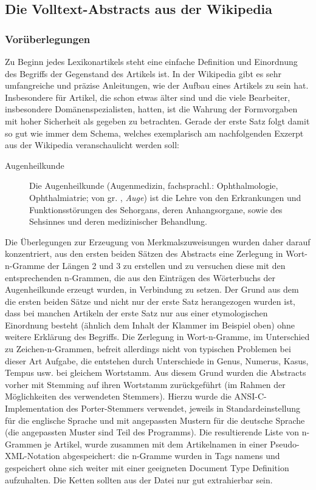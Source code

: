 \documentclass[pagesize,DIV=calc,12pt,draft]{scrreprt}
\begin{document}
\subsection{Die Volltext-Abstracts aus der Wikipedia}

\subsubsection{Vorüberlegungen}

Zu Beginn jedes Lexikonartikels steht eine einfache Definition und Einordnung des Begriffs der Gegenstand des Artikels ist. 
In der Wikipedia gibt es sehr umfangreiche und präzise Anleitungen, wie der Aufbau eines Artikels zu sein hat. 
Insbesondere für Artikel, die schon etwas älter sind und die viele Bearbeiter, insbesondere Domänenspezialisten, hatten, ist die Wahrung der Formvorgaben mit hoher Sicherheit als gegeben zu betrachten. 
Gerade der erste Satz folgt damit so gut wie immer dem Schema, welches exemplarisch am nachfolgenden Exzerpt aus der Wikipedia veranschaulicht werden soll: 

\begin{description}
\item[Augenheilkunde]
Die Augenheilkunde (Augenmedizin, fachsprachl.: Ophthalmologie, Ophthalmiatrie; von gr. \textomikron\textphi\texttheta\textalpha\textlambda\textmugreek\textomikron\textvarsigma, \emph{Auge}) ist die Lehre von den Erkrankungen und Funktionsstörungen des Sehorgans, deren Anhangsorgane, sowie des Sehsinnes und deren medizinischer Behandlung. 
\end{description}

Die Überlegungen zur Erzeugung von Merkmalszuweisungen wurden daher darauf konzentriert, aus den ersten beiden Sätzen des Abstracts eine Zerlegung in Wort-n-Gramme der Längen 2 und 3 zu erstellen und zu versuchen diese mit den entsprechenden n-Grammen, die aus den Einträgen des Wörterbuchs der Augenheilkunde erzeugt wurden, in Verbindung zu setzen. 
Der Grund aus dem die ersten beiden Sätze und nicht nur der erste Satz herangezogen wurden ist, dass bei manchen Artikeln der erste Satz nur aus einer etymologischen Einordnung besteht (ähnlich dem Inhalt der Klammer im Beispiel oben) ohne weitere Erklärung des Begriffs. 
Die Zerlegung in Wort-n-Gramme, im Unterschied zu Zeichen-n-Grammen, befreit allerdings nicht von typischen Problemen bei dieser Art Aufgabe, die entstehen durch Unterschiede in Genus, Numerus, Kasus, Tempus usw. bei gleichem Wortstamm. 
Aus diesem Grund wurden die Abstracts vorher mit Stemming auf ihren Wortstamm zurückgeführt (im Rahmen der Möglichkeiten des verwendeten Stemmers). 
Hierzu wurde die ANSI-C-Implementation des Porter-Stemmers verwendet, jeweils in Standardeinstellung für die englische Sprache und mit angepassten Mustern für die deutsche Sprache (die angepassten Muster sind Teil des Programms). 
Die resultierende Liste von n-Grammen je Artikel, wurde zusammen mit dem Artikelnamen in einer Pseudo-XML-Notation abgespeichert: die n-Gramme wurden in Tags namens und gespeichert ohne sich weiter mit einer geeigneten Document Type Definition aufzuhalten. 
Die Ketten sollten aus der Datei nur gut extrahierbar sein. 
\end{document}
